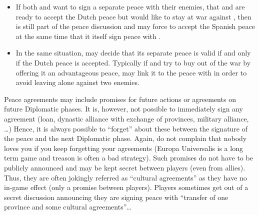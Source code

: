 \begin{exemple}[Continued]
  \begin{itemize}
  \item If both \HOL and \HIS want to sign a separate peace with their
    enemies, that \FRA and \HIS are ready to accept the Dutch peace but \ANG
    would like to stay at war against \HIS, then \HOL is still part of the
    peace discussion and may force \ANG to accept the Spanish peace at the
    same time that it itself sign peace with \FRA.
  \item In the same situation, \HIS may decide that its separate peace is
    valid if and only if the Dutch peace is accepted. Typically if \ANG and
    \HOL try to buy \HIS out of the war by offering it an advantageous peace,
    \HIS may link it to the peace with \HOL in order to avoid leaving \FRA
    alone against two enemies.
  \end{itemize}
\end{exemple}

\bparag Peace agreements may include promises for future actions or agreements
on future Diplomatic phases.
\bparag It is, however, not possible to immediately sign any agreement (loan,
dynastic alliance with exchange of provinces, military alliance, \ldots)
Hence, it is always possible to ``forget'' about these between the signature
of the peace and the next Diplomatic phase. Again, do not complain that nobody
loves you if you keep forgetting your agreements (Europa Universalis is a long
term game and treason is often a bad strategy).
\bparag Such promises do not have to be publicly announced and may be kept
secret between players (even from allies). Thus, they are often jokingly
referred as ``cultural agreements'' as they have no in-game effect (only a
promise between players). Players sometimes get out of a secret discussion
announcing they are signing peace with ``transfer of one province and some
cultural agreements''\ldots

